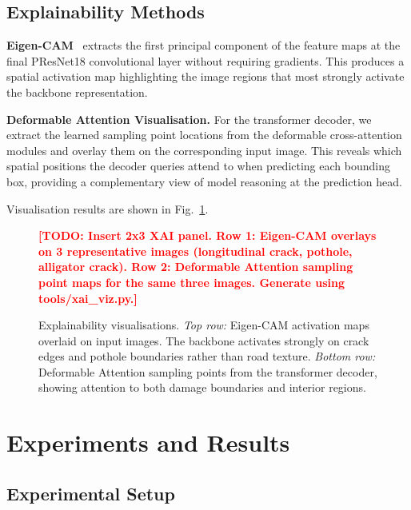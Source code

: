 \documentclass[conference]{IEEEtran}
\newcommand{\TODO}[1]{\textcolor{red}{\textbf{[TODO: #1]}}}
\begin{document}
\subsection{Explainability Methods}

\textbf{Eigen-CAM}~\cite{muhammad2020eigencam} extracts the first principal component
of the feature maps at the final PResNet18 convolutional layer without requiring
gradients.
This produces a spatial activation map highlighting the image regions that most
strongly activate the backbone representation.

\textbf{Deformable Attention Visualisation.}
For the transformer decoder, we extract the learned sampling point locations from the
deformable cross-attention modules and overlay them on the corresponding input image.
This reveals which spatial positions the decoder queries attend to when predicting
each bounding box, providing a complementary view of model reasoning at the
prediction head.

Visualisation results are shown in Fig.~\ref{fig:xai}.

\begin{figure}[t]
  \centering
  \TODO{Insert 2x3 XAI panel. Row 1: Eigen-CAM overlays on 3 representative images
        (longitudinal crack, pothole, alligator crack). Row 2: Deformable Attention
        sampling point maps for the same three images.
        Generate using tools/xai\_viz.py.}
  \caption{Explainability visualisations. \textit{Top row:} Eigen-CAM activation
           maps overlaid on input images. The backbone activates strongly on
           crack edges and pothole boundaries rather than road texture.
           \textit{Bottom row:} Deformable Attention sampling points from the
           transformer decoder, showing attention to both damage boundaries
           and interior regions.}
  \label{fig:xai}
\end{figure}

\section{Experiments and Results}
\label{sec:experiments}

\subsection{Experimental Setup}
\end{document}
